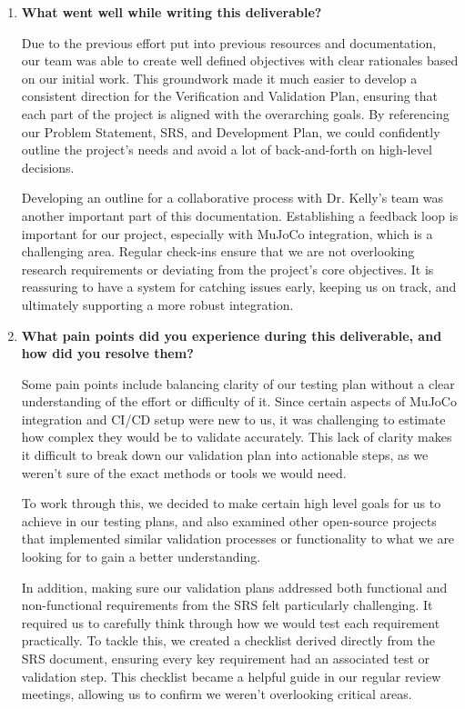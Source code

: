 \documentclass[12pt, titlepage]{article}
\begin{document}
\begin{enumerate}
  \item \textbf{What went well while writing this deliverable?} 
  
  Due to the previous effort put into previous resources and documentation, our team was able to create well defined objectives with clear rationales based on our initial work. This groundwork made it much easier to develop a consistent direction for the Verification and Validation Plan, ensuring that each part of the project is aligned with the overarching goals. By referencing our Problem Statement, SRS, and Development Plan, we could confidently outline the project’s needs and avoid a lot of back-and-forth on high-level decisions. 

Developing an outline for a collaborative process with Dr. Kelly’s team was another important part of this documentation. Establishing a feedback loop is important for our project, especially with MuJoCo integration, which is a challenging area. Regular check-ins ensure that we are not overlooking research requirements or deviating from the project’s core objectives. It is reassuring to have a system for catching issues early, keeping us on track, and ultimately supporting a more robust integration.

  \item \textbf{What pain points did you experience during this deliverable, and how
    did you resolve them?}

    Some pain points include balancing clarity of our testing plan without a clear understanding of the effort or difficulty of it. Since certain aspects of MuJoCo integration and CI/CD setup were new to us, it was challenging to estimate how complex they would be to validate accurately. This lack of clarity makes it difficult to break down our validation plan into actionable steps, as we weren’t sure of the exact methods or tools we would need.

To work through this, we decided to make certain high level goals for us to achieve in our testing plans, and also examined other open-source projects that implemented similar validation processes or functionality to what we are looking for to gain a better understanding.

In addition, making sure our validation plans addressed both functional and non-functional requirements from the SRS felt particularly challenging. It required us to carefully think through how we would test each requirement practically. To tackle this, we created a checklist derived directly from the SRS document, ensuring every key requirement had an associated test or validation step. This checklist became a helpful guide in our regular review meetings, allowing us to confirm we weren’t overlooking critical areas.


\end{enumerate}
\end{document}
